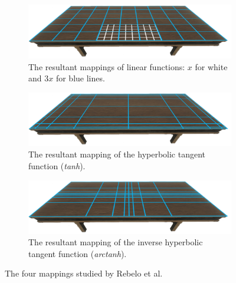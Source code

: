  \begin{figure}[t]
    \centering
    \begin{subfigure}{0.45\textwidth} %
        \includegraphics[width=\linewidth]{NOVAthesisFiles/Images/papers/table-linear.jpg}
        \caption{The resultant mappings of linear functions: \(x\) for white and \(3x\) for blue lines.}
        \label{fig:avatars-torso}
    \end{subfigure}
    \begin{subfigure}{0.45\textwidth} %
        \includegraphics[width=\linewidth]{NOVAthesisFiles/Images/papers/table-hyperbolic1.jpg}
        \caption{The resultant mapping of the hyperbolic tangent function (\textit{tanh}).}
        \label{fig:avatars-ik-legs}
    \end{subfigure}
    \begin{subfigure}{0.45\textwidth} %
        \includegraphics[width=\linewidth]{NOVAthesisFiles/Images/papers/table-hyperbolic2.jpg}
        \caption{The resultant mapping of the inverse hyperbolic tangent function (\textit{arctanh}).}
        \label{fig:avatars-vive-trackers}
    \end{subfigure}
    \caption[Mappings by Rebelo et al.]{The four mappings studied by Rebelo et al. \cite{Rebelo2022}}
    \label{fig:mappings}
\end{figure}
  

